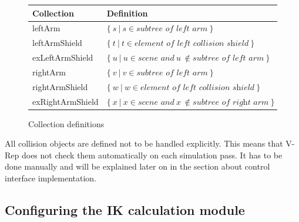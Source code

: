 \begin{figure}
  \centering
  \label{fig:col_defs}
  \begin{tabular}[h]{|l|l|} \hline
	\textbf{Collection} & \textbf{Definition} \\ \hline
	leftArm & $\{~s~|~s\in\textit{subtree of left arm}~\}$ \\
	leftArmShield & $\{~t~|~t\in\textit{element of left collision shield}~\}$ \\
	exLeftArmShield & $\{~u~|~u\in\textit{scene and}~u~\notin\textit{subtree of left arm}~\}$ \\
	rightArm & $\{~v~|~v\in\textit{subtree of left arm}~\}$ \\
	rightArmShield & $\{~w~|~w\in\textit{element of left collision shield}~\}$ \\
	exRightArmShield & $\{~x~|~x\in\textit{scene and}~x~\notin\textit{subtree of right arm}~\}$ \\ \hline
  \end{tabular}
  \caption{Collection definitions}
\end{figure}
All collision objects are defined not to be handled explicitly. This means that V-Rep does not check them automatically on each simulation pass. It has to be done manually and will be explained later on in the section about control interface implementation.

\subsection{Configuring the IK calculation module}

